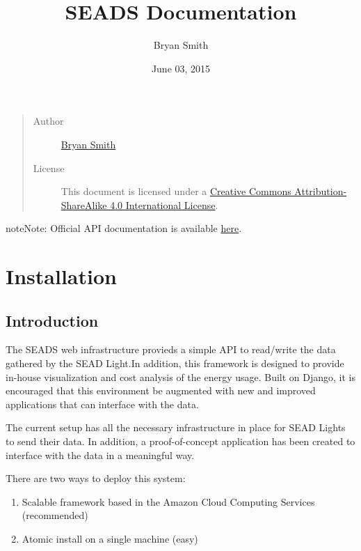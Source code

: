 \documentclass[letterpaper,10pt,english]{sphinxmanual}
\title{SEADS Documentation}
\date{June 03, 2015}
\author{Bryan Smith}
\begin{document}
\maketitle
\tableofcontents
{}\label{index::doc}

\begin{quote}\begin{description}
\item[{Author}] \leavevmode
\href{https://github.com/brabsmit}{Bryan Smith}

\item[{License}] \leavevmode
This document is licensed under a \href{http://creativecommons.org/licenses/by-sa/4.0/}{Creative Commons Attribution-ShareAlike 4.0 International License}.

\end{description}\end{quote}

\begin{notice}{note}{Note:}
Official API documentation is available \href{http://seads.io/docs/}{here}.
\end{notice}


\chapter{Installation}
\label{installation:installation}\label{installation:smart-energy-analysis-and-disaggregation-web-components}\label{installation::doc}\label{installation:id1}

\section{Introduction}
\label{installation:introduction}
The SEADS web infrastructure provieds a simple API to read/write the data gathered by the SEAD Light.In addition, this framework is designed to provide in-house visualization and cost analysis of the energy usage. Built on Django, it is encouraged that this environment be augmented with new and improved applications that can interface with the data.

The current setup has all the necessary infrastructure in place for SEAD Lights to send their data. In addition, a proof-of-concept application has been created to interface with the data in a meaningful way.

There are two ways to deploy this system:
\begin{enumerate}
\item {} 
Scalable framework based in the Amazon Cloud Computing Services (recommended)

\item {} 
Atomic install on a single machine (easy)

\end{enumerate}
\end{document}
